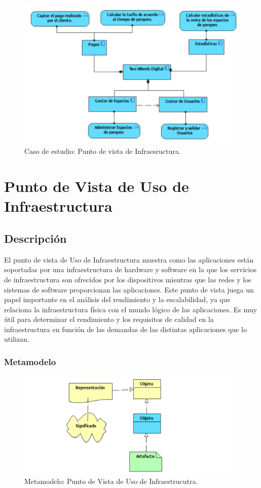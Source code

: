 \begin{figure}[H]
	\centering
	\includegraphics[width=1.0\textwidth]{imagenes/Caso_Estudio/Tecnologia/ComAplicacion.PDF}
	\caption{Caso de estudio: Punto de vista de Infraesructura.}
	\label{fig:gap_analysis}
\end{figure}

\section{Punto de Vista de Uso de Infraestructura}
\subsection{Descripción}
El punto de vista de Uso de Infraestructura muestra como las aplicaciones están soportadas por una infraestructura de hardware y software en la que los servicios de infraestructura  son ofrecidos por los dispositivos mientras que las  redes y los sistemas de software proporcionan las aplicaciones. Este punto de vista juega un papel importante en el análisis del rendimiento y la escalabilidad, ya que relaciona la infraestructura física con el mundo lógico de las aplicaciones. Es muy útil para determinar el rendimiento y los requisitos de calidad en la infraestructura en función de las demandas de las distintas aplicaciones que lo utilizan.

\subsubsection{Metamodelo}
\begin{figure}[H]
	\centering
	\includegraphics[width=1.0\textwidth]{imagenes/Metamodelos/Tecnologia/Estructura_informacion.PDF}
	\caption{Metamodelo: Punto de Vista de Uso de Infraestrucutra.}
	\label{fig:gap_analysis}
\end{figure}


